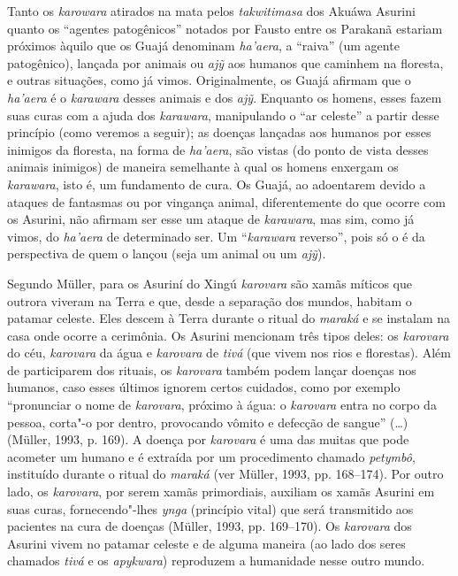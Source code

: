 Tanto os \emph{karowara} atirados na mata pelos \emph{takwitimasa} dos
Akuáwa Asurini quanto os ``agentes patogênicos'' notados por Fausto entre
os Parakanã estariam próximos àquilo que os Guajá denominam
\emph{ha'aera}, a ``raiva'' (um agente patogênico), lançada por animais ou
\emph{ajỹ} aos humanos que caminhem na floresta, e outras situações,
como já vimos. Originalmente, os Guajá afirmam que o \emph{ha'aera} é o
\emph{karawara} desses animais e dos \emph{ajỹ}. Enquanto os homens,
esses fazem suas curas com a ajuda dos \emph{karawara}, manipulando o
``ar celeste'' a partir desse princípio (como veremos a seguir); as
doenças lançadas aos humanos por esses inimigos da floresta, na forma de
\emph{ha'aera}, são vistas (do ponto de vista desses animais inimigos)
de maneira semelhante à qual os homens enxergam os \emph{karawara}, isto
é, um fundamento de cura. Os Guajá, ao adoentarem devido a ataques de
fantasmas ou por vingança animal, diferentemente do que ocorre com os
Asurini, não afirmam ser esse um ataque de \emph{karawara}, mas sim,
como já vimos, do \emph{ha'aera} de determinado ser. Um ``\emph{karawara}
reverso'', pois só o é da perspectiva de quem o lançou (seja um animal ou
um \emph{ajỹ}).

Segundo Müller, para os Asuriní do Xingú \emph{karovara} são xamãs
míticos que outrora viveram na Terra e que, desde a separação dos
mundos, habitam o patamar celeste. Eles descem à Terra durante o ritual
do \emph{maraká} e se instalam na casa onde ocorre a cerimônia. Os
Asurini mencionam três tipos deles: os \emph{karovara} do céu,
\emph{karovara} da água e \emph{karovara} de \emph{tivá} (que vivem nos
rios e florestas). Além de participarem dos rituais, os \emph{karovara}
também podem lançar doenças nos humanos, caso esses últimos ignorem
certos cuidados, como por exemplo ``pronunciar o nome de \emph{karovara},
próximo à água: o \emph{karovara} entra no corpo da pessoa, corta"-o por
dentro, provocando vômito e defecção de sangue'' (\ldots{}) (Müller, 1993, p.
169). A doença por \emph{karovara} é uma das muitas que pode acometer um
humano e é extraída por um procedimento chamado \emph{petymbô},
instituído durante o ritual do \emph{maraká} (ver Müller, 1993, pp.
168--174). Por outro lado, os \emph{karovara}, por serem xamãs
primordiais, auxiliam os xamãs Asurini em suas curas, fornecendo"-lhes
\emph{ynga} (princípio vital) que será transmitido aos pacientes na cura
de doenças (Müller, 1993, pp. 169--170). Os \emph{karovara} dos Asurini
vivem no patamar celeste e de alguma maneira (ao lado dos seres chamados
\emph{tivá} e os \emph{apykwara}) reproduzem a humanidade nesse outro
mundo.

